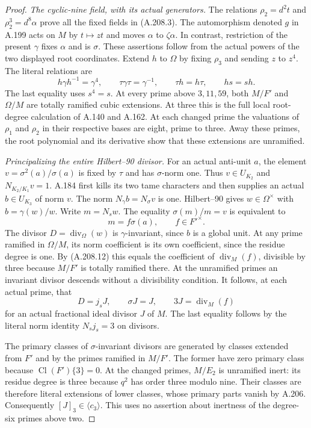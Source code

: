 \begin{proof}
\emph{The cyclic-nine field, with its actual generators.}
The relations \(\rho_2=d^2t\) and
\(\rho_2^3=d^8\alpha\) prove all the fixed fields in
(A.208.3).  The automorphism denoted \(g\) in A.199 acts on
\(M\) by \(t\mapsto zt\) and moves \(\alpha\) to
\(\zeta\alpha\).  In contrast, restriction of the present
\(\gamma\) fixes \(\alpha\) and is \(\sigma\).
These assertions follow from the actual powers of the two
displayed root coordinates.  Extend \(h\) to \(\Omega\)
by fixing \(\rho_3\) and sending \(z\) to \(z^4\).
The literal relations are
\[
 h\gamma h^{-1}=\gamma^4,
 \qquad \tau\gamma\tau=\gamma^{-1},
 \qquad \tau h=h\tau,
 \qquad hs=sh.
\tag{A.208.11}
\]
The last equality uses \(s^4=s\).  At every prime above
\(3,11,59\), both \(M/F'\) and \(\Omega/M\) are
totally ramified cubic extensions.  At three this is the
full local root-degree calculation of A.140 and A.162.
At each changed prime the valuations of \(\rho_1\) and
\(\rho_2\) in their respective bases are eight, prime to
three.  Away these primes, the root polynomial and its
derivative show that these extensions are unramified.

\emph{Principalizing the entire Hilbert--90 divisor.}
For an actual anti-unit \(a\), the element
\(v=\sigma^2(a)/\sigma(a)\) is fixed by \(\tau\)
and has \(\sigma\)-norm one.  Thus \(v\in U_{K_2}\)
and \(N_{K_2/K_1}v=1\).  A.184 first kills its two tame
characters and then supplies an actual \(b\in U_{K_3}\)
of norm \(v\).  The norm \(N_\gamma b=N_\sigma v\)
is one.  Hilbert--90 gives \(w\in\Omega^\times\) with
\(b=\gamma(w)/w\).  Write \(m=N_sw\).  The equality
\(\sigma(m)/m=v\) is equivalent to
\[
                    m=f\sigma(a),\qquad f\in F'^\times.
\tag{A.208.12}
\]
The divisor \(D=\operatorname{div}_\Omega(w)\) is
\(\gamma\)-invariant, since \(b\) is a global unit.
At any prime ramified in \(\Omega/M\), its norm coefficient
is its own coefficient, since the residue degree is one.
By (A.208.12) this equals the coefficient of
\(\operatorname{div}_M(f)\), divisible by three because
\(M/F'\) is totally ramified there.  At the unramified
primes an invariant divisor descends without a divisibility
condition.  It follows, at each actual prime, that
\[
 D=j_sJ,\qquad \sigma J=J,\qquad
                   3J=\operatorname{div}_M(f)
\tag{A.208.13}
\]
for an actual fractional ideal divisor \(J\) of \(M\).
The last equality follows by the literal norm identity
\(N_sj_s=3\) on divisors.

The primary classes of \(\sigma\)-invariant divisors are
generated by classes extended from \(F'\) and by the primes
ramified in \(M/F'\).  The former have zero primary class
because \(\operatorname{Cl}(F')\{3\}=0\).  At the changed
primes, \(M/E_2\) is unramified inert: its residue degree is
three because \(q^2\) has order three modulo nine.  Their
classes are therefore literal extensions of lower classes,
whose primary parts vanish by A.206.  Consequently
\([J]_3\in\langle c_3\rangle\).  This uses no assertion
about inertness of the degree-six primes above two.


\end{proof}
